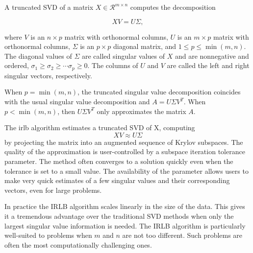\documentclass[landscape,a0b,final]{a0poster}
\newenvironment{poster}{
  \begin{center}
  \begin{minipage}[c]{0.98\textwidth}
}{
  \end{minipage} 
  \end{center}
}
\newcommand{\pbox}[4]{
\psshadowbox[#3]{
\begin{minipage}[t][#2][t]{#1}
#4
\end{minipage}
}}
\begin{document}
\begin{poster}
\begin{multicols}{3}
A truncated SVD of a matrix $X \in \mathcal{R}^{m \times n}$ computes the
decomposition

\[
XV = U\Sigma,
\]

where $V$ is an $n\times p$ matrix with orthonormal columns,
$U$ is an $m \times p$ matrix with orthonormal columns,
$\Sigma$ is an $p \times p$
diagonal matrix, and $1\le p\le\min(m,n)$.
The diagonal values of $\Sigma$ are called singular values of $X$ and
are nonnegative and ordered,
$\sigma_1\ge \sigma_2\ge \cdots \sigma_p \geq 0$.
The columns of $U$ and $V$ are
called the left and right singular vectors, respectively.

\vspace{0.75cm}

When $p=\min(m,n)$, the truncated singular value decomposition coincides
with the usual singular value decomposition and $A = U\Sigma V^T$. When
$p<\min(m,n)$, then $U\Sigma V^T$ only approximates the matrix $A$.

\vspace{0.75cm}
The irlb algorithm estimates a truncated SVD of X, computing
\[
XV \approx U\Sigma
\]
by projecting the matrix into an augmented sequence of Krylov subspaces.
The quality of the approximation is user-controlled by a subspace iteration
tolerance parameter. The method often converges to a solution quickly even
when the tolerance is set to a small value. The availability of the parameter
allows users to make very quick estimates of a few singular values and
their corresponding vectors, even for large problems.



\vspace{1cm}\begin{center}\pbox{0.8\columnwidth}{}{linewidth=2mm,framearc=0.1,fillstyle=gradient,gradangle=0,gradbegin=white,gradend=white,gradmidpoint=1.0,framesep=1em}{\begin{center}\bf{Discussion}\end{center}}\end{center}\vspace{1.25cm}

In practice the IRLB algorithm scales linearly in the size of the data.
This gives it a tremendous advantage over the traditional SVD methods when only
the largest singular value information is needed. The IRLB algorithm is
particularly well-suited to problems when $m$ and $n$ are not too different.
Such problems are often the most computationally challenging ones.


\end{multicols}
\end{poster}
\end{document}
